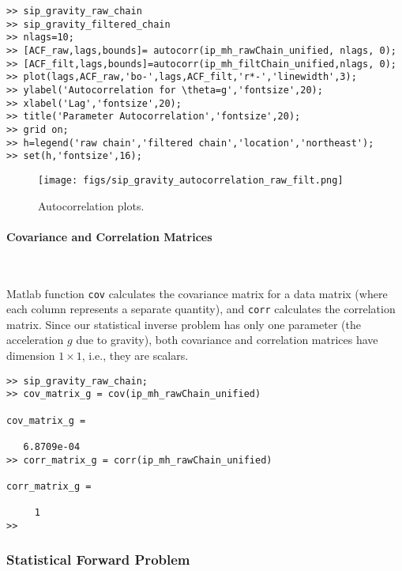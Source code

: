 \begin{lstlisting}[label=matlab:autocorr,caption={Matlab code for the autocorrelation plots.}]
% inside Matlab
>> sip_gravity_raw_chain
>> sip_gravity_filtered_chain
>> nlags=10;
>> [ACF_raw,lags,bounds]= autocorr(ip_mh_rawChain_unified, nlags, 0);
>> [ACF_filt,lags,bounds]=autocorr(ip_mh_filtChain_unified,nlags, 0);
>> plot(lags,ACF_raw,'bo-',lags,ACF_filt,'r*-','linewidth',3);
>> ylabel('Autocorrelation for \theta=g','fontsize',20);
>> xlabel('Lag','fontsize',20);
>> title('Parameter Autocorrelation','fontsize',20);
>> grid on;
>> h=legend('raw chain','filtered chain','location','northeast');
>> set(h,'fontsize',16);
\end{lstlisting}

\begin{figure}[p]
\centering
\texttt{[image: figs/sip\_gravity\_autocorrelation\_raw\_filt.png]}
\vspace{-8pt}
\caption{
Autocorrelation plots. }
\label{fig:sip_gravity_autocorrelation_raw_filt}
\end{figure}

\paragraph{Covariance and Correlation Matrices}\

Matlab function \verb+cov+ calculates the covariance matrix for a data matrix
(where each column represents a separate quantity), and \verb+corr+ calculates the correlation matrix.
Since our statistical inverse problem has only one parameter (the acceleration $g$ due to gravity),
both covariance and correlation matrices have dimension $1 \times 1$, i.e., they are scalars.

\begin{lstlisting}[label=matlab:cov_matrix,caption={Matlab code for finding the covariance matrix.}]
% inside Matlab
>> sip_gravity_raw_chain;
>> cov_matrix_g = cov(ip_mh_rawChain_unified)

cov_matrix_g =

   6.8709e-04
>> corr_matrix_g = corr(ip_mh_rawChain_unified)

corr_matrix_g =

     1
>>
\end{lstlisting}

\newpage

\subsubsection{Statistical Forward Problem}


